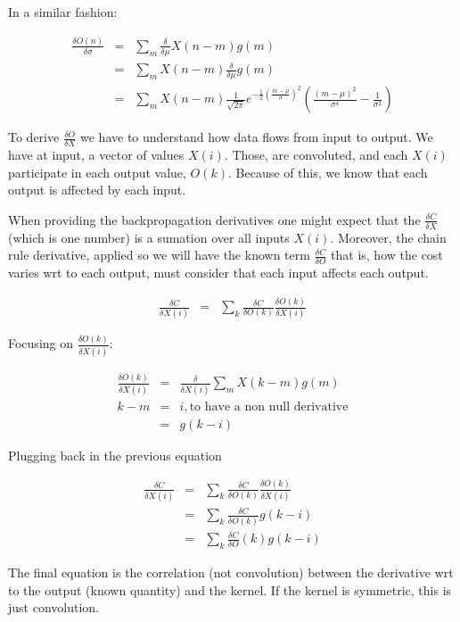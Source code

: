 \documentclass{article}
\begin{document}
In a similar fashion:


\begin{eqnarray}
	\frac{\delta O(n)}{\delta\sigma}&=& \sum_m \frac{\delta}{\delta \mu} X(n-m)g(m) \\
	&=&\sum_m X(n-m) \frac{\delta}{\delta \mu} g(m) \\
	&=&\sum_m X(n-m) \frac{1}{\sqrt{2 \pi}} e^{-\frac{1}{2} \left(\frac{m - \mu}{\sigma}\right)^2} \left( \frac{(m-\mu)^2}{\sigma^4}  - \frac{1}{\sigma ^2} \right)
\end{eqnarray}

To derive $\frac{\delta O}{\delta X}$ we have to understand how data flows from input to output. We have at input, a vector of values $X(i)$. Those, are convoluted, and each $X(i)$ participate in each output value, $O(k)$. Because of this, we know that each output is affected by each input.

When providing the backpropagation derivatives one might expect that the $\frac{\delta C}{\delta X}$ (which is one number) is a sumation over all inputs $X(i)$. Moreover, the chain rule derivative, applied so we will have the known term $\frac{\delta C}{\delta O}$ that is, how the cost varies wrt to each output, must consider that each input affects each output.

\begin{eqnarray}
	\frac{\delta C}{\delta X(i)}&=& \sum_{k}  \frac{\delta C}{\delta O(k)} \frac{\delta O(k)}{\delta X(i)}
\end{eqnarray}

Focusing on $\frac{\delta O(k)}{\delta X(i)}$:

\begin{eqnarray}
	\frac{\delta O(k)}{\delta X(i)}&=&\frac{\delta}{\delta X(i)} \sum_{m} X(k - m) g(m)\\
	k-m&=&i, \text{to have a non null derivative}\\
	&=&g(k-i)
\end{eqnarray}

Plugging back in the previous equation

\begin{eqnarray}
	\frac{\delta C}{\delta X(i)}&=& \sum_{k}  \frac{\delta C}{\delta O(k)} \frac{\delta O(k)}{\delta X(i)}\\
	&=&\sum_{k}\frac{\delta C}{\delta O(k)} g(k-i) \\
	&=&\sum_{k}\frac{\delta C}{\delta O}(k) g(k-i)
\end{eqnarray}

The final equation is the correlation (not convolution) between the derivative wrt to the output (known quantity) and the kernel. If the kernel is symmetric, this is just convolution.
\end{document}
